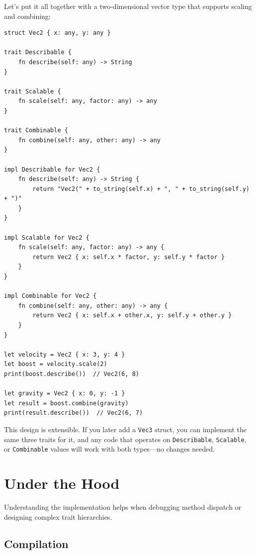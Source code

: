 Let's put it all together with a two-dimensional vector type that
supports scaling and combining:

\begin{lstlisting}[language=Lattice, caption={A complete trait-driven design}]
struct Vec2 { x: any, y: any }

trait Describable {
    fn describe(self: any) -> String
}

trait Scalable {
    fn scale(self: any, factor: any) -> any
}

trait Combinable {
    fn combine(self: any, other: any) -> any
}

impl Describable for Vec2 {
    fn describe(self: any) -> String {
        return "Vec2(" + to_string(self.x) + ", " + to_string(self.y) + ")"
    }
}

impl Scalable for Vec2 {
    fn scale(self: any, factor: any) -> any {
        return Vec2 { x: self.x * factor, y: self.y * factor }
    }
}

impl Combinable for Vec2 {
    fn combine(self: any, other: any) -> any {
        return Vec2 { x: self.x + other.x, y: self.y + other.y }
    }
}

let velocity = Vec2 { x: 3, y: 4 }
let boost = velocity.scale(2)
print(boost.describe())  // Vec2(6, 8)

let gravity = Vec2 { x: 0, y: -1 }
let result = boost.combine(gravity)
print(result.describe())  // Vec2(6, 7)
\end{lstlisting}

This design is extensible. If you later add a \lstinline|Vec3| struct, you
can implement the same three traits for it, and any code that operates on
\lstinline|Describable|, \lstinline|Scalable|, or \lstinline|Combinable|
values will work with both types---no changes needed.

\section{Under the Hood}\label{sec:trait-internals}

Understanding the implementation helps when debugging method dispatch
or designing complex trait hierarchies.

\subsection{Compilation}

